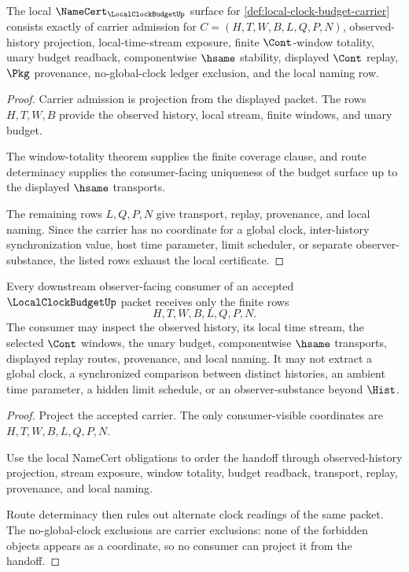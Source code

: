 \begin{theorem}
\label{thm:local-clock-budget-namecert-obligations}
The local $\NameCert_{\LocalClockBudgetUp}$ surface for \autoref{def:local-clock-budget-carrier} consists exactly of carrier admission for $C=(H,T,W,B,L,Q,P,N)$, observed-history projection, local-time-stream exposure, finite $\Cont$-window totality, unary budget readback, componentwise $\hsame$ stability, displayed $\Cont$ replay, $\Pkg$ provenance, no-global-clock ledger exclusion, and the local naming row.
\end{theorem}
\begin{proof}
Carrier admission is projection from the displayed packet. The rows $H,T,W,B$ provide the observed history, local stream, finite windows, and unary budget.

The window-totality theorem supplies the finite coverage clause, and route determinacy supplies the consumer-facing uniqueness of the budget surface up to the displayed $\hsame$ transports.

The remaining rows $L,Q,P,N$ give transport, replay, provenance, and local naming. Since the carrier has no coordinate for a global clock, inter-history synchronization value, host time parameter, limit scheduler, or separate observer-substance, the listed rows exhaust the local certificate.
\end{proof}

\begin{theorem}
\label{thm:local-clock-budget-observer-handoff}
Every downstream observer-facing consumer of an accepted $\LocalClockBudgetUp$ packet receives only the finite rows
$$
H,T,W,B,L,Q,P,N.
$$
The consumer may inspect the observed history, its local time stream, the selected $\Cont$ windows, the unary budget, componentwise $\hsame$ transports, displayed replay routes, provenance, and local naming. It may not extract a global clock, a synchronized comparison between distinct histories, an ambient time parameter, a hidden limit schedule, or an observer-substance beyond $\Hist$.
\end{theorem}
\begin{proof}
Project the accepted carrier. The only consumer-visible coordinates are $H,T,W,B,L,Q,P,N$.

Use the local NameCert obligations to order the handoff through observed-history projection, stream exposure, window totality, budget readback, transport, replay, provenance, and local naming.

Route determinacy then rules out alternate clock readings of the same packet. The no-global-clock exclusions are carrier exclusions: none of the forbidden objects appears as a coordinate, so no consumer can project it from the handoff.
\end{proof}

